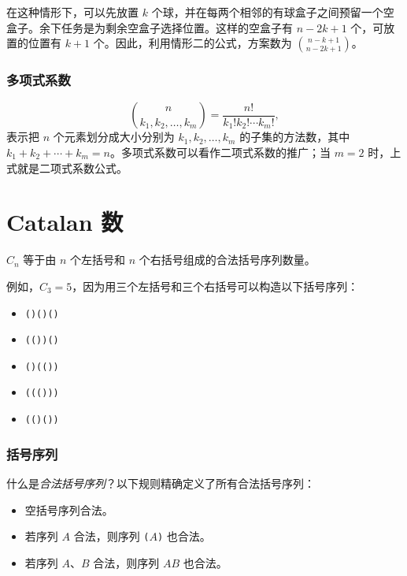 在这种情形下，可以先放置 $k$ 个球，并在每两个相邻的有球盒子之间预留一个空盒子。余下任务是为剩余空盒子选择位置。这样的空盒子有 $n-2k+1$ 个，可放置的位置有 $k+1$ 个。因此，利用情形二的公式，方案数为 ${n-k+1 \choose n-2k+1}$。

\subsubsection{多项式系数}


\[ {n \choose k_1,k_2,\ldots,k_m} = \frac{n!}{k_1! k_2! \cdots k_m!}, \]
表示把 $n$ 个元素划分成大小分别为 $k_1,k_2,\ldots,k_m$ 的子集的方法数，其中 $k_1+k_2+\cdots+k_m=n$。多项式系数可以看作二项式系数的推广；当 $m=2$ 时，上式就是二项式系数公式。

\section{Catalan 数}


$C_n$ 等于由 $n$ 个左括号和 $n$ 个右括号组成的合法括号序列数量。

例如，$C_3=5$，因为用三个左括号和三个右括号可以构造以下括号序列：

\begin{itemize}[noitemsep]
\item \texttt{()()()}
\item \texttt{(())()}
\item \texttt{()(())}
\item \texttt{((()))}
\item \texttt{(()())}
\end{itemize}

\subsubsection{括号序列}


什么是\emph{合法括号序列}？以下规则精确定义了所有合法括号序列：

\begin{itemize}
\item 空括号序列合法。
\item 若序列 $A$ 合法，则序列 \texttt{(}$A$\texttt{)} 也合法。
\item 若序列 $A$、$B$ 合法，则序列 $AB$ 也合法。
\end{itemize}

